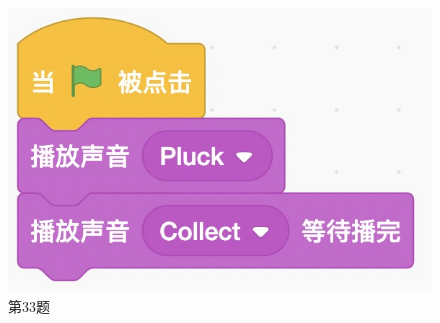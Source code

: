 \documentclass[10pt, a4paper]{article}
\begin{document}
\begin{figure}[htbp]
\begin{minipage}[t]{.28\textwidth}
            \includegraphics[width=\textwidth]{33.jpg}
            \caption*{第33题}
        \end{minipage}
    \end{figure}
\end{document}
